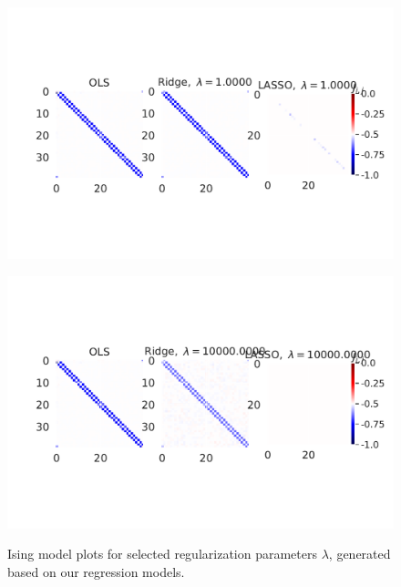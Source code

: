 \begin{figure}[H]
\includegraphics[width = 0.6\paperwidth]{figures/regression_mehta_5.pdf} \\
\end{figure}
\begin{figure}[H]
\includegraphics[width = 0.6\paperwidth]{figures/regression_mehta_9.pdf} \\
\caption{Ising model plots for selected regularization parameters $\lambda$, generated based on our regression models.
	 } 
\label{fig:regression-mehta}
\end{figure}

